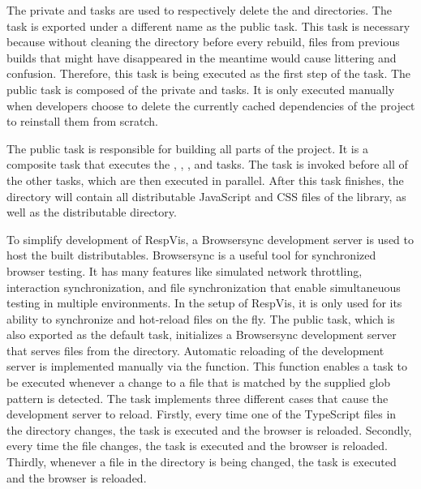 The private  and  tasks are used to respectively delete the  and  directories.
The  task is exported under a different name as the public  task.
This task is necessary because without cleaning the  directory before every rebuild, files from previous builds that might have disappeared in the meantime would cause littering and confusion.
Therefore, this task is being executed as the first step of the  task.
The public  task is composed of the private  and  tasks.
It is only executed manually when developers choose to delete the currently cached dependencies of the project to reinstall them from scratch.

The public  task is responsible for building all parts of the project.
It is a composite task that executes the , , , and  tasks.
The  task is invoked before all of the other tasks, which are then executed in parallel.
After this task finishes, the  directory will contain all distributable JavaScript and CSS files of the library, as well as the distributable  directory.

To simplify development of RespVis, a Browsersync \parencite{Browsersync} development server is used to host the built distributables.
Browsersync is a useful tool for synchronized browser testing.
It has many features like simulated network throttling, interaction synchronization, and file synchronization that enable simultaneuous testing in multiple environments.
In the setup of RespVis, it is only used for its ability to synchronize and hot-reload files on the fly.
The public  task, which is also exported as the default task, initializes a Browsersync development server that serves files from the  directory.
Automatic reloading of the development server is implemented manually via the  function.
This function enables a task to be executed whenever a change to a file that is matched by the supplied glob pattern is detected.
The  task implements three different cases that cause the development server to reload.
Firstly, every time one of the TypeScript files in the  directory changes, the  task is executed and the browser is reloaded.
Secondly, every time the  file changes, the  task is executed and the browser is reloaded.
Thirdly, whenever a file in the  directory is being changed, the  task is executed and the browser is reloaded.

